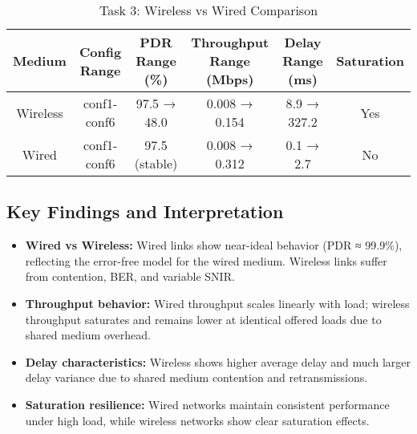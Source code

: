 \documentclass{article}
\begin{document}
\begin{table}[H]

\centering

\caption{Task 3: Wireless vs Wired Comparison}

\begin{tabular}{|c|c|c|c|c|c|}

\hline

Medium & Config Range & PDR Range (\%) & Throughput Range (Mbps) & Delay Range (ms) & Saturation \\

\hline

Wireless & conf1-conf6 & 97.5 → 48.0 & 0.008 → 0.154 & 8.9 → 327.2 & Yes \\

Wired & conf1-conf6 & 97.5 (stable) & 0.008 → 0.312 & 0.1 → 2.7 & No \\

\hline

\end{tabular}

\end{table}

\subsection{Key Findings and Interpretation}

\begin{itemize}

    \item \textbf{Wired vs Wireless:} Wired links show near-ideal behavior (PDR ≈ 99.9\%), reflecting the error-free model for the wired medium. Wireless links suffer from contention, BER, and variable SNIR.

    \item \textbf{Throughput behavior:} Wired throughput scales linearly with load; wireless throughput saturates and remains lower at identical offered loads due to shared medium overhead.

    \item \textbf{Delay characteristics:} Wireless shows higher average delay and much larger delay variance due to shared medium contention and retransmissions.

    \item \textbf{Saturation resilience:} Wired networks maintain consistent performance under high load, while wireless networks show clear saturation effects.

\end{itemize}
\end{document}
